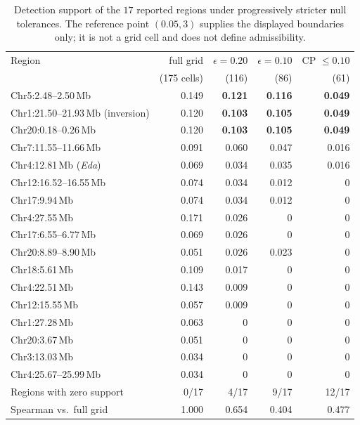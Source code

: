 \begin{table}[t]\centering
\caption{Detection support of the $17$ reported regions under progressively stricter
null tolerances. The reference point $(0.05,3)$ supplies the displayed boundaries
only; it is not a grid cell and does not define admissibility.}
\label{tab:support}
\begin{tabular}{lrrrr}
\toprule
Region & full grid & $\epsilon=0.20$ & $\epsilon=0.10$ & CP $\le0.10$\\
       & (175 cells) & (116) & (86) & (61)\\
\midrule
Chr5:2.48--2.50\,Mb            & 0.149 & \textbf{0.121} & \textbf{0.116} & \textbf{0.049}\\
Chr1:21.50--21.93\,Mb (inversion) & 0.120 & \textbf{0.103} & \textbf{0.105} & \textbf{0.049}\\
Chr20:0.18--0.26\,Mb           & 0.120 & \textbf{0.103} & \textbf{0.105} & \textbf{0.049}\\
Chr7:11.55--11.66\,Mb          & 0.091 & 0.060 & 0.047 & 0.016\\
Chr4:12.81\,Mb (\emph{Eda})    & 0.069 & 0.034 & 0.035 & 0.016\\
Chr12:16.52--16.55\,Mb         & 0.074 & 0.034 & 0.012 & 0\\
Chr17:9.94\,Mb                 & 0.074 & 0.034 & 0.012 & 0\\
Chr4:27.55\,Mb                 & 0.171 & 0.026 & 0     & 0\\
Chr17:6.55--6.77\,Mb           & 0.069 & 0.026 & 0     & 0\\
Chr20:8.89--8.90\,Mb           & 0.051 & 0.026 & 0.023 & 0\\
Chr18:5.61\,Mb                 & 0.109 & 0.017 & 0     & 0\\
Chr4:22.51\,Mb                 & 0.143 & 0.009 & 0     & 0\\
Chr12:15.55\,Mb                & 0.057 & 0.009 & 0     & 0\\
Chr1:27.28\,Mb                 & 0.063 & 0     & 0     & 0\\
Chr20:3.67\,Mb                 & 0.051 & 0     & 0     & 0\\
Chr3:13.03\,Mb                 & 0.034 & 0     & 0     & 0\\
Chr4:25.67--25.99\,Mb          & 0.034 & 0     & 0     & 0\\
\midrule
Regions with zero support      & 0/17 & 4/17 & 9/17 & 12/17\\
Spearman vs.\ full grid        & 1.000 & 0.654 & 0.404 & 0.477\\
\bottomrule
\end{tabular}
\end{table}

